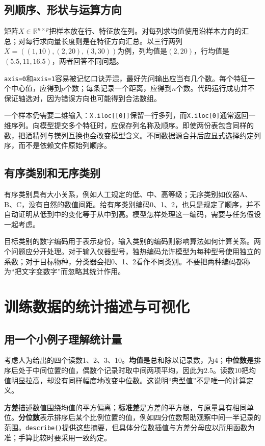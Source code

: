 \subsection{列顺序、形状与运算方向}
矩阵$X\in\mathbb R^{n\times p}$把样本放在行、特征放在列。对每列求均值使用沿样本方向的汇总；对每行求向量长度则是在特征方向汇总。以三行两列$X=((1,10),(2,20),(3,30))$为例，列均值是$(2,20)$，行均值是$(5.5,11,16.5)$，两者回答不同问题。

\texttt{axis=0}和\texttt{axis=1}容易被记忆口诀弄混，最好先问输出应当有几个数。每个特征一个中心值，应得到$p$个数；每条记录一个距离，应得到$n$个数。代码运行成功并不保证轴选对，因为错误方向也可能得到合法数组。

一个样本仍需要二维输入：\texttt{X.iloc[[0]]}保留一行多列，而\texttt{X.iloc[0]}通常返回一维序列。向模型提交多个特征时，应保存列名称及顺序。即使两份表包含同样的数，把酒精列与镁列互换也会改变模型含义。不同数据源合并后应显式选择约定列序，而不是依赖文件原始列顺序。

\subsection{有序类别和无序类别}
有序类别具有大小关系，例如人工规定的低、中、高等级；无序类别如仪器A、B、C，没有自然的数值间距。给有序类别编码0、1、2，也只是规定了顺序，并不自动证明从低到中的变化等于从中到高。模型怎样处理这一编码，需要与任务假设一起考虑。

目标类别的数字编码用于表示身份，输入类别的编码则影响算法如何计算关系。两个问题应分开处理。对于输入仪器型号，独热编码允许模型为每种型号使用独立的系数；对于目标物种，分类器会把0、1、2看作不同类别。不要把两种编码都称为“把文字变数字”而忽略其统计作用。

\section{训练数据的统计描述与可视化}
\subsection{用一个小例子理解统计量}
考虑人为给出的四个读数1、2、3、10。\textbf{均值}是总和除以记录数，为4；\textbf{中位数}是排序后处于中间位置的值，偶数个记录时取中间两项平均，因此为2.5。读数10把均值明显拉高，却没有同样幅度地改变中位数。这说明“典型值”不是唯一的计算定义。

\textbf{方差}描述数值围绕均值的平方偏离；\textbf{标准差}是方差的平方根，与原量具有相同单位。\textbf{分位数}表示排序后某个比例位置的值，例如四分位数帮助观察中间一半记录的范围。\texttt{describe()}提供这些摘要，但具体分位数插值与方差分母应以所用函数为准；手算比较时要采用一致约定。

